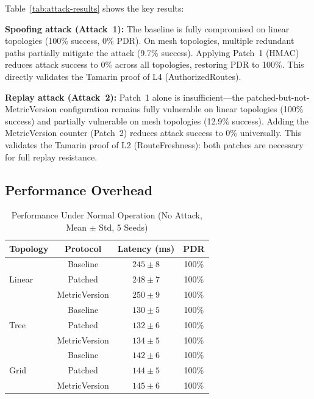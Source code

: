 \documentclass[journal]{IEEEtran}
\begin{document}
Table~\ref{tab:attack-results} shows the key results:

\textbf{Spoofing attack (Attack~1):} The baseline is fully
compromised on linear topologies (100\% success, 0\% PDR).
On mesh topologies, multiple redundant paths partially mitigate
the attack (9.7\% success). Applying Patch~1 (HMAC) reduces attack
success to 0\% across all topologies, restoring PDR to 100\%. This
directly validates the Tamarin proof of L4 (AuthorizedRoutes).

\textbf{Replay attack (Attack~2):} Patch~1 alone is insufficient—the
patched-but-not-MetricVersion configuration remains fully vulnerable
on linear topologies (100\% success) and partially vulnerable on
mesh topologies (12.9\% success). Adding the MetricVersion counter
(Patch~2) reduces attack success to 0\% universally. This validates
the Tamarin proof of L2 (RouteFreshness): both patches are necessary
for full replay resistance.

\subsection{Performance Overhead}

\begin{table}[t]
  \centering
  \caption{Performance Under Normal Operation (No Attack, Mean $\pm$ Std, 5 Seeds)}
  \label{tab:overhead}
  \begin{tabular}{lccc}
    \toprule
    \textbf{Topology} & \textbf{Protocol} & \textbf{Latency (ms)} & \textbf{PDR} \\
    \midrule
    \multirow{3}{*}{Linear}
      & Baseline     & $245 \pm 8$  & 100\% \\
      & Patched      & $248 \pm 7$  & 100\% \\
      & MetricVersion & $250 \pm 9$ & 100\% \\
    \midrule
    \multirow{3}{*}{Tree}
      & Baseline     & $130 \pm 5$  & 100\% \\
      & Patched      & $132 \pm 6$  & 100\% \\
      & MetricVersion & $134 \pm 5$ & 100\% \\
    \midrule
    \multirow{3}{*}{Grid}
      & Baseline     & $142 \pm 6$  & 100\% \\
      & Patched      & $144 \pm 5$  & 100\% \\
      & MetricVersion & $145 \pm 6$ & 100\% \\
    \bottomrule
  \end{tabular}
\end{table}
\end{document}
